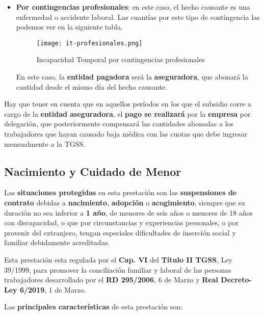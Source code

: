 \begin{itemize}
\begin{itemize}
        \item \textbf{Por contingencias profesionales}: en este caso, el hecho causante es una enfermedad o accidente laboral. Las cuantías por este tipo de contingencia las podemos ver en la siguiente tabla.

        \begin{figure}[H]
            \centering
            \texttt{[image: it-profesionales.png]}
            \caption{Incapacidad Temporal por contingencias profesionales}
        \end{figure}

        En este caso, la \textbf{entidad pagadora} será la \textbf{aseguradora}, que abonará la cantidad desde el mismo día del hecho causante.
    \end{itemize}
\end{itemize}

Hay que tener en cuenta que en aquellos períodos en los que el subsidio corre a cargo de la \textbf{entidad aseguradora}, el \textbf{pago se realizará} por la \textbf{empresa} por delegación, que posteriormente compensará las cantidades abonadas a los trabajadores que hayan causado baja médica con las cuotas que debe ingresar mensualmente a la TGSS.

\subsection{Nacimiento y Cuidado de Menor}
Las \textbf{situaciones protegidas} en esta prestación son las \textbf{suspensiones de contrato} debidas a \textbf{nacimiento}, \textbf{adopción} o \textbf{acogimiento}, siempre que su duración no sea inferior a \textbf{1 año}, de menores de seis años o menores de 18 años con discapacidad, o que por circunstancias y experiencias personales, o por provenir del extranjero, tengan especiales dificultades de inserción social y familiar debidamente acreditadas.

Esta prestación esta regulada por el \textbf{Cap. VI} del \textbf{Título II TGSS}, Ley 39/1999, para promover la conciliación familiar y laboral de las personas trabajadores desarrollado por el \textbf{RD 295/2006}, 6 de Marzo y \textbf{Real Decreto-Ley 6/2019}, 1 de Marzo.

Las \textbf{principales características} de esta prestación son:

